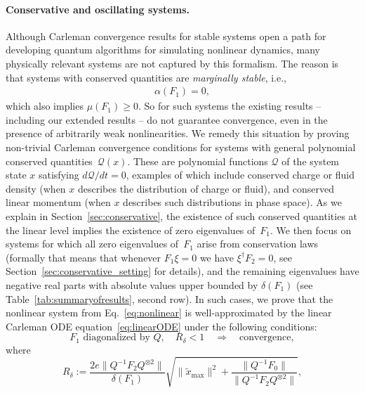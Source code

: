 \documentclass[superscriptaddress,onecolumn,nofootinbib,longbibliography,a4paper,accepted=2026-09-29]{quantumarticle}
\theoremstyle{plain}
\theoremstyle{definition}
\numberwithin{thm}{section}
\numberwithin{assumption}{section}
\numberwithin{lemma}{section}
\numberwithin{prop}{section}
\numberwithin{cor}{section}
\numberwithin{definition}{section}
\numberwithin{rmk}{section}
\numberwithin{equation}{section}
\newcommand\Q{ {\mathcal Q} }
\begin{document}
\paragraph{Conservative and oscillating systems.}


    Although Carleman convergence results for stable systems open a path for developing quantum algorithms for simulating nonlinear dynamics, many physically relevant systems are not captured by this formalism. The reason is that systems with conserved quantities are \emph{marginally stable}, i.e., 
    \begin{align}
        \alpha(F_1)=0,
    \end{align}
    which also implies $\mu(F_1)\geq 0$. So for such systems the existing results -- including our extended results -- do not guarantee convergence, even in the presence of arbitrarily weak nonlinearities. We remedy this situation by proving non-trivial Carleman convergence conditions for systems with general polynomial conserved quantities~$\Q(x)$. These are polynomial functions $\Q$ of the system state $x$ satisfying $d\Q/dt=0$, examples of which include conserved charge or fluid density (when $x$ describes the distribution of charge or fluid), and conserved linear momentum (when $x$ describes such distributions in phase space). As we explain in Section~\ref{sec:conservative}, the existence of such conserved quantities at the linear level implies the existence of zero eigenvalues of~$F_1$. We then focus on systems for which all zero eigenvalues of~$F_1$ arise from conservation laws (formally that means that whenever $F_1\xi=0$ we have $\xi^\dagger F_2=0$, see Section~\ref{sec:conservative_setting} for details), and the remaining eigenvalues have negative real parts with absolute values upper bounded by $\delta(F_1)$ (see Table~\ref{tab:summaryofresults}, second row). In such cases, we prove that the nonlinear system from Eq.~\eqref{eq:nonlinear} is well-approximated by the linear Carleman ODE equation~\eqref{eq:linearODE} under the following conditions:
        \begin{equation}
            F_1\text{~diagonalized~by~} Q,\quad R_\delta<1 \quad\Rightarrow\quad \textrm{convergence},
        \end{equation}
        where
        \begin{equation}
            R_\delta:=  \frac{2e\|Q^{-1}F_2Q^{\otimes 2}\| }{\delta(F_1)}\sqrt{\|\tilde{x}_{\mathrm{max}}\|^2+\frac{\|Q^{-1} F_0\|}{\|Q^{-1}F_2Q^{\otimes 2}\|}},
        \end{equation}
\end{document}

